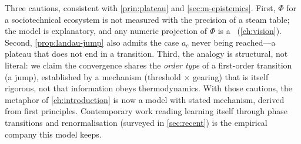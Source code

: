 \begin{remark}
Three cautions, consistent with \cref{prin:plateau} and \cref{sec:m-epistemics}.
First, $\Phi$ for a sociotechnical ecosystem is not measured with the precision of
a steam table; the model is explanatory, and any numeric projection of $\Phi$ is a
\forecast\ (\cref{ch:vision}). Second, \cref{prop:landau-jump} also admits the
case $a_c$ never being reached---a plateau that does not end in a transition.
Third, the analogy is structural, not literal: we claim the convergence shares the
\emph{order type} of a first-order transition (a jump), established by a
mechanism (threshold $\times$ gearing) that is itself rigorous, not that
information obeys thermodynamics. With those cautions, the metaphor of
\cref{ch:introduction} is now a model with stated mechanism, derived from first
principles. Contemporary work reading learning itself through phase transitions
and renormalisation (surveyed in \cref{sec:recent}) is the empirical company this
model keeps.
\end{remark}
